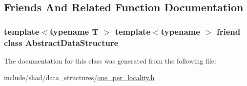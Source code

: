 \subsection{Friends And Related Function Documentation}
\hypertarget{classshad_1_1OnePerLocality_ab18afa4496cc863ddc11bab94b2adf57}{
\subsubsection[{Abstract\-Data\-Structure}]{\setlength{\rightskip}{0pt plus 5cm}template$<$typename T $>$ template$<$typename $>$ friend class {\bf Abstract\-Data\-Structure}\hspace{0.3cm}{\ttfamily [friend]}}}\label{classshad_1_1OnePerLocality_ab18afa4496cc863ddc11bab94b2adf57}


The documentation for this class was generated from the following file\-:\begin{DoxyCompactItemize}
\item 
include/shad/data\-\_\-structures/\hyperlink{one__per__locality_8h}{one\-\_\-per\-\_\-locality.\-h}\end{DoxyCompactItemize}
